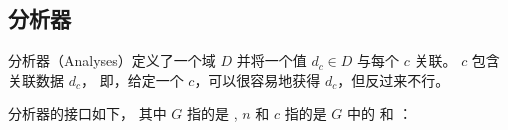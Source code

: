 
\subsection{\eclass 分析器}
\label{sec:analysis}

\eclass 分析器（\eclass Analyses）定义了一个域 $D$ 并将一个值 $d_{c} \in D$ 与每个 \eclass $c$ 关联。
\eclass $c$ 包含关联数据 $d_{c}$，
  即，给定一个 \eclass $c$，可以很容易地获得 $d_{c}$，但反过来不行。

\eclass 分析器的接口如下，
  其中 $G$ 指的是 \egraph,
  $n$ 和 $c$ 指的是 $G$ 中的 \enodes 和 \eclasses ：



